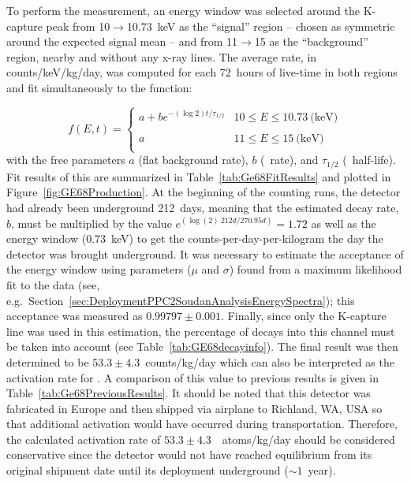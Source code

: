 	To perform the measurement, an energy window was selected around the K-capture peak from 10$\to$10.73~keV as the ``signal'' region -- chosen as symmetric around the expected signal mean -- and from 11$\to$15 as the ``background'' region, nearby and without any x-ray lines.  The average rate, in counts/keV/kg/day, was computed for each 72~hours of live-time in both regions and fit simultaneously to the function:
	
			\begin{equation}
				f(E,t) = \left\{ 
				\begin{array}{lr} 
 					a + b e^{-\left( \log{2} \right) t/\tau_{1/2}} & 10 \leq E \leq 10.73~\textrm{(keV)}\\
					\\
					a & 11 \leq E \leq 15~\textrm{(keV)}\\
				\end{array} \right.			
			\end{equation}
with the free parameters $a$ (flat background rate), $b$ (\gersixeight~rate), and $\tau_{1/2}$ (\gersixeight~half-life).  Fit results of this are summarized in Table~\ref{tab:Ge68FitResults} and plotted in Figure~\ref{fig:GE68Production}.  At the beginning of the counting runs, the detector had already been underground 212~days, meaning that the estimated decay rate, $b$, must be multiplied by the value $e^{(\log(2)~212 d/270.95 d)} = 1.72$ as well as  the energy window (0.73~keV) to get the counts-per-day-per-kilogram the day the detector was brought underground.  It was necessary to estimate the acceptance of the energy window using parameters ($\mu$ and $\sigma$) found from a maximum likelihood fit to the data (see, e.g.~Section~\ref{sec:DeploymentPPC2SoudanAnalysisEnergySpectra}); this acceptance was measured as $0.99797\pm0.001$.  Finally, since only the K-capture line was used in this estimation, the percentage of decays into this channel must be taken into account (see Table~\ref{tab:GE68decayinfo}).  The final result was then determined to be $53.3\pm4.3$~counts/kg/day which can also be interpreted as the activation rate for \gersixeight.  A comparison of this value to previous results is given in Table~\ref{tab:Ge68PreviousResults}.  It should be noted that this detector was fabricated in Europe and then shipped via airplane to Richland, WA, USA so that additional activation would have occurred during transportation.  Therefore, the calculated activation rate of $53.3\pm4.3$~\gersixeight~atoms/kg/day should be considered conservative since the detector would not have reached equilibrium from its original shipment date until its deployment underground ($\sim1$~year).

